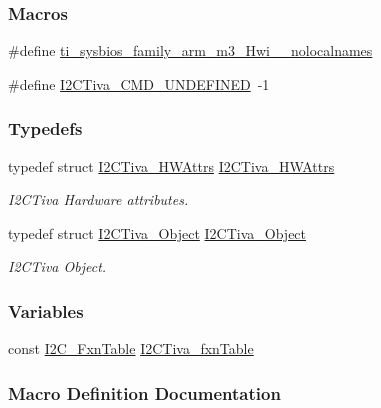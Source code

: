 \subsubsection*{Macros}
\begin{DoxyCompactItemize}
\item 
\#define \hyperlink{_i2_c_tiva_8h_aaa17ecf48f5762e2e1bdb0bab8aacf0c}{ti\-\_\-sysbios\-\_\-family\-\_\-arm\-\_\-m3\-\_\-\-Hwi\-\_\-\-\_\-nolocalnames}
\item 
\#define \hyperlink{_i2_c_tiva_8h_aafc3a9be9d97cec76d1d0c2fd6124359}{I2\-C\-Tiva\-\_\-\-C\-M\-D\-\_\-\-U\-N\-D\-E\-F\-I\-N\-E\-D}~-\/1
\end{DoxyCompactItemize}
\subsubsection*{Typedefs}
\begin{DoxyCompactItemize}
\item 
typedef struct \hyperlink{struct_i2_c_tiva___h_w_attrs}{I2\-C\-Tiva\-\_\-\-H\-W\-Attrs} \hyperlink{_i2_c_tiva_8h_af20903ad2ff3e34d27132e11aef68ad5}{I2\-C\-Tiva\-\_\-\-H\-W\-Attrs}
\begin{DoxyCompactList}\small\item\em I2\-C\-Tiva Hardware attributes. \end{DoxyCompactList}\item 
typedef struct \hyperlink{struct_i2_c_tiva___object}{I2\-C\-Tiva\-\_\-\-Object} \hyperlink{_i2_c_tiva_8h_a56bbf0bf756fabe1c1c6b905a1b88ee7}{I2\-C\-Tiva\-\_\-\-Object}
\begin{DoxyCompactList}\small\item\em I2\-C\-Tiva Object. \end{DoxyCompactList}\end{DoxyCompactItemize}
\subsubsection*{Variables}
\begin{DoxyCompactItemize}
\item 
const \hyperlink{struct_i2_c___fxn_table}{I2\-C\-\_\-\-Fxn\-Table} \hyperlink{_i2_c_tiva_8h_aa37c457a45a8fa5451616bdb9cb5ce49}{I2\-C\-Tiva\-\_\-fxn\-Table}
\end{DoxyCompactItemize}


\subsubsection{Macro Definition Documentation}
